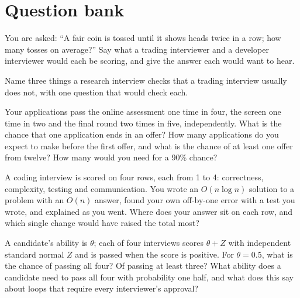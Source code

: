 \section{Question bank}

\begin{interviewq}\label{iq:iv:what-each-interview-tests-by-role:1}
You are asked: ``A fair coin is tossed until it shows heads twice in a row; how many tosses on average?'' Say
what a trading interviewer and a developer interviewer would each be scoring, and give the answer each would
want to hear.
\end{interviewq}

\begin{interviewq}\label{iq:iv:what-each-interview-tests-by-role:2}
Name three things a research interview checks that a trading interview usually does not, with one question
that would check each.
\end{interviewq}

\begin{interviewq}\label{iq:iv:what-each-interview-tests-by-role:3}
Your applications pass the online assessment one time in four, the screen one time in two and the final
round two times in five, independently. What is the chance that one application ends in an offer? How many
applications do you expect to make before the first offer, and what is the chance of at least one offer from
twelve? How many would you need for a 90\% chance?
\end{interviewq}

\begin{interviewq}\label{iq:iv:what-each-interview-tests-by-role:4}
A coding interview is scored on four rows, each from 1 to 4: correctness, complexity, testing and
communication. You wrote an $O(n \log n)$ solution to a problem with an $O(n)$ answer, found your own
off-by-one error with a test you wrote, and explained as you went. Where does your answer sit on each row,
and which single change would have raised the total most?
\end{interviewq}

\begin{interviewq}\label{iq:iv:what-each-interview-tests-by-role:5}
A candidate's ability is $\theta$; each of four interviews scores $\theta + Z$ with independent standard normal
$Z$ and is passed when the score is positive. For $\theta = 0.5$, what is the chance of passing all four? Of
passing at least three? What ability does a candidate need to pass all four with probability one half, and
what does this say about loops that require every interviewer's approval?
\end{interviewq}

